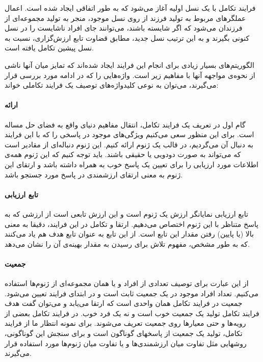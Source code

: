 \documentclass{report}
\begin{document}
فرایند تکامل با یک نسل اولیه آغاز می‌شود که به طور اتفاقی ایجاد شده است. اعمال عملگرهای مربوط به تولید فرزند از روی نسل موجود، منجر به تولید مجموعه‌ای از فرزندان می‌شود که اگر شایسته باشند، می‌توانند جای افراد ناشایست را در نسل کنونی بگیرند و به این ترتیب نسل جدید، مطابق قضاوت تابع ارزش‌گزاری، نسبت به نسل پیشین تکامل یافته است.

الگوریتم‌های بسیار زیادی برای انجام این فرایند ایجاد شده‌اند که تمایز میان آنها ناشی از نحوه‌ی مواجهه آنها با مفاهیم زیر است. واژه‌هایی را که در ادامه مورد بررسی قرار می‌گیرند، می‌توان به نوعی کلیدواژه‌های توصیف یک فرایند تکاملی خواند:

\paragraph{ارائه}
گام اول در تعریف یک فرایند تکامل، انتقال مفاهیم دنیای واقع به فضای حل مساله است. برای این منظور سعی می‌کنیم ویژگی‌های موجود در پاسخی را که با این فرایند به دنبال آن می‌گردیم، در قالب یک ژنوم ارائه کنیم. این ژنوم دنباله‌ای از مقادیر است که می‌تواند به صورت دودویی یا حقیقی باشند. باید توجه کنیم که این ژنوم همه‌ی اطلاعات مورد ارزیابی را برای تعیین یک پاسخ خوب به همراه داشته باشد و ارتقای این ژنوم به معنی ارتقای ارزشمندی در پاسخ مورد جستجو باشد.

\paragraph{تابع ارزیابی}
تابع ارزیابی نمایانگر ارزش یک ژنوم است و این ارزش تابعی است از ارزشی که به پاسخ متناظر با این ژنوم اختصاص می‌دهیم. ارتقا و تکامل در این فرایند، دقیقا به معنی بالا (یا پایین) رفتن مقدار این تابع است. از این تابع به عنوان تابع هدف هم یاد می‌کنند که به طور مشخص، مفهوم تلاش برای رسیدن به مقدار بهینه‌ی آن را نشان می‌دهد.

\paragraph{جمعیت}
از این عبارت برای توصیف تعدادی از افراد و یا همان مجموعه‌ای از ژنوم‌ها استفاده می‌کنیم. تعداد افراد موجود در یک جمعیت ثابت است و در ابتدای فرایند تعیین می‌شود. جمعیت در فرایند تکامل همان واحدی است که ارتقا می‌یابد و می‌توان گفت هدف فرایند تکامل تولید یک جمعیت خوب است و نه یک فرد خوب. در فرایند تکامل بعضی از رویه‌ها و حتی معیارها روی جمعیت تعریف می‌شوند. برای نمونه انتظار ما از فرایند تکامل، تولید یک جمعیت از پاسخهای گوناگون است و برای سنجش این گوناگونی، روشهایی مثل تفاوت میان ارزشمندی‌ها و یا تفاوت میان ژنوم‌ها مورد استفاده قرار می‌گیرند.
\end{document}
